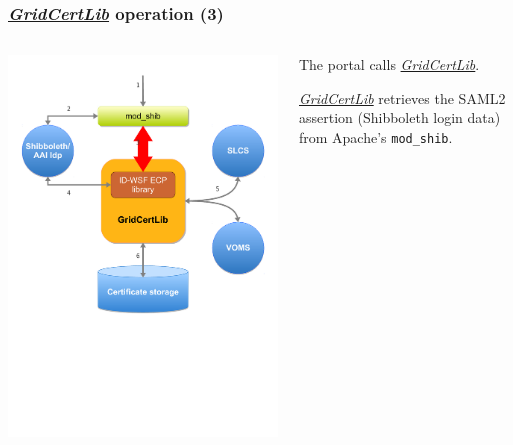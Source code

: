 \documentclass{beamer}
\newcommand{\+}{\vspace{1em}}
\newcommand{\GridCertLib}{\href{http://gridcertlib.googlecode.com/}{{\em GridCertLib}}}
\begin{document}
\begin{frame}
  \frametitle{\GridCertLib{} operation (3)}
  \begin{columns}
    \begin{column}{0.5\textwidth}
    \includegraphics[width=\linewidth,viewport=0 300 600 650]{architecture3}
    \end{column}
    \begin{column}{0.5\textwidth}
      \begin{center}
        The portal calls \GridCertLib{}.
        
        \+ \GridCertLib{} retrieves the SAML2 assertion (Shibboleth login
        data) from Apache's \texttt{mod\_shib}.
      \end{center}
    \end{column}
  \end{columns}
\end{frame}
\end{document}

